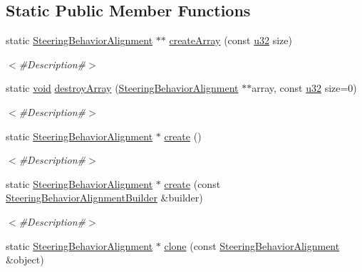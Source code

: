 \subsection*{Static Public Member Functions}
\begin{DoxyCompactItemize}
\item 
static \mbox{\hyperlink{classnjli_1_1_steering_behavior_alignment}{Steering\+Behavior\+Alignment}} $\ast$$\ast$ \mbox{\hyperlink{classnjli_1_1_steering_behavior_alignment_a2f7ef7a5e93eb8081f7a00650cb6c5e4}{create\+Array}} (const \mbox{\hyperlink{_util_8h_a10e94b422ef0c20dcdec20d31a1f5049}{u32}} size)
\begin{DoxyCompactList}\small\item\em $<$\#\+Description\#$>$ \end{DoxyCompactList}\item 
static \mbox{\hyperlink{_thread_8h_af1e856da2e658414cb2456cb6f7ebc66}{void}} \mbox{\hyperlink{classnjli_1_1_steering_behavior_alignment_aaa4572d52e3e9b2c3c792dbbe061e2fb}{destroy\+Array}} (\mbox{\hyperlink{classnjli_1_1_steering_behavior_alignment}{Steering\+Behavior\+Alignment}} $\ast$$\ast$array, const \mbox{\hyperlink{_util_8h_a10e94b422ef0c20dcdec20d31a1f5049}{u32}} size=0)
\begin{DoxyCompactList}\small\item\em $<$\#\+Description\#$>$ \end{DoxyCompactList}\item 
static \mbox{\hyperlink{classnjli_1_1_steering_behavior_alignment}{Steering\+Behavior\+Alignment}} $\ast$ \mbox{\hyperlink{classnjli_1_1_steering_behavior_alignment_a4aeea58e195226f38b2e8d22f54d01aa}{create}} ()
\begin{DoxyCompactList}\small\item\em $<$\#\+Description\#$>$ \end{DoxyCompactList}\item 
static \mbox{\hyperlink{classnjli_1_1_steering_behavior_alignment}{Steering\+Behavior\+Alignment}} $\ast$ \mbox{\hyperlink{classnjli_1_1_steering_behavior_alignment_aaec3d8b8e4c3eaab849953bb1352d0cc}{create}} (const \mbox{\hyperlink{classnjli_1_1_steering_behavior_alignment_builder}{Steering\+Behavior\+Alignment\+Builder}} \&builder)
\begin{DoxyCompactList}\small\item\em $<$\#\+Description\#$>$ \end{DoxyCompactList}\item 
static \mbox{\hyperlink{classnjli_1_1_steering_behavior_alignment}{Steering\+Behavior\+Alignment}} $\ast$ \mbox{\hyperlink{classnjli_1_1_steering_behavior_alignment_a1a8619aea2138978c70770837344f2b3}{clone}} (const \mbox{\hyperlink{classnjli_1_1_steering_behavior_alignment}{Steering\+Behavior\+Alignment}} \&object)

\end{DoxyCompactItemize}
